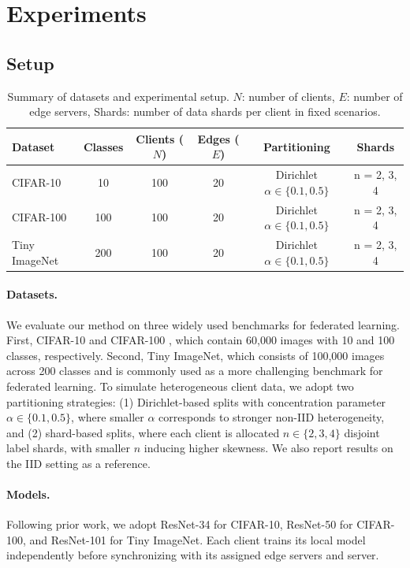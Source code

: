 \documentclass[twoside]{article}
\begin{document}
\section{Experiments}
\label{sec:experiments}
    \subsection{Setup}
        \begin{table}[!htpb]
            \centering
            \caption{Summary of datasets and experimental setup. $N$: number of clients, $E$: number of edge servers, Shards: number of data shards per client in fixed scenarios.}
            \label{tab:datasets}
            \begin{tabular}{lccccc}
            \toprule
            Dataset & Classes & Clients ($N$) & Edges ($E$) & Partitioning & Shards \\
            \midrule
            CIFAR-10       & 10  & 100 & 20 & Dirichlet $\alpha \in \{0.1, 0.5\}$ & n = 2, 3, 4 \\
            CIFAR-100      & 100 & 100 & 20 & Dirichlet $\alpha \in \{0.1, 0.5\}$ & n = 2, 3, 4 \\
            Tiny ImageNet  & 200 & 100 & 20 & Dirichlet $\alpha \in \{0.1, 0.5\}$ & n = 2, 3, 4 \\
            \bottomrule
            \end{tabular}
        \end{table}
        \paragraph{Datasets.} 
        We evaluate our method on three widely used benchmarks for federated learning. 
        First, CIFAR-10 and CIFAR-100 \cite{krizhevsky2009learning}, which contain 60,000 images with 10 and 100 classes, respectively. 
        Second, Tiny ImageNet, which consists of 100,000 images across 200 classes and is commonly used as a more challenging benchmark for federated learning. 
        To simulate heterogeneous client data, we adopt two partitioning strategies: (1) Dirichlet-based splits with concentration parameter $\alpha \in \{0.1, 0.5\}$, where smaller $\alpha$ corresponds to stronger non-IID heterogeneity, and (2) shard-based splits, where each client is allocated $n \in \{2,3,4\}$ disjoint label shards, with smaller $n$ inducing higher skewness. 
        We also report results on the IID setting as a reference. 

        \paragraph{Models.} 
        Following prior work, we adopt ResNet-34 for CIFAR-10, ResNet-50 for CIFAR-100, and ResNet-101 for Tiny ImageNet. 
        Each client trains its local model independently before synchronizing with its assigned edge servers and server.
             
\end{document}
